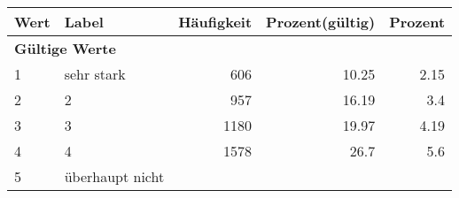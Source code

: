      \begin{longtable}{lXrrr}
     \toprule
     \textbf{Wert} & \textbf{Label} & \textbf{Häufigkeit} & \textbf{Prozent(gültig)} & \textbf{Prozent} \\
     \endhead
     \midrule
     \multicolumn{5}{l}{\textbf{Gültige Werte}}\\

     1 &
     \multicolumn{1}{X}{ sehr stark   } &


       \num{606} &
       \num[round-mode=places,round-precision=2]{10.25} &
         \num[round-mode=places,round-precision=2]{2.15} \\

     2 &
     \multicolumn{1}{X}{ 2   } &


       \num{957} &
       \num[round-mode=places,round-precision=2]{16.19} &
         \num[round-mode=places,round-precision=2]{3.4} \\

     3 &
     \multicolumn{1}{X}{ 3   } &


       \num{1180} &
       \num[round-mode=places,round-precision=2]{19.97} &
         \num[round-mode=places,round-precision=2]{4.19} \\

     4 &
     \multicolumn{1}{X}{ 4   } &


       \num{1578} &
       \num[round-mode=places,round-precision=2]{26.7} &
         \num[round-mode=places,round-precision=2]{5.6} \\

     5 &
     \multicolumn{1}{X}{ überhaupt nicht   } &



\end{longtable}
